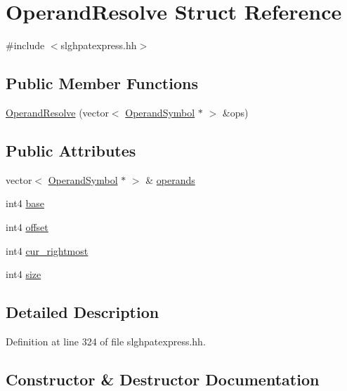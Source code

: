 \hypertarget{struct_operand_resolve}{}\section{Operand\+Resolve Struct Reference}
\label{struct_operand_resolve}


{\ttfamily \#include $<$slghpatexpress.\+hh$>$}

\subsection*{Public Member Functions}
\begin{DoxyCompactItemize}
\item 
\mbox{\hyperlink{struct_operand_resolve_a8a21090ca0ccc61bab067fde9155683b}{Operand\+Resolve}} (vector$<$ \mbox{\hyperlink{class_operand_symbol}{Operand\+Symbol}} $\ast$ $>$ \&ops)
\end{DoxyCompactItemize}
\subsection*{Public Attributes}
\begin{DoxyCompactItemize}
\item 
vector$<$ \mbox{\hyperlink{class_operand_symbol}{Operand\+Symbol}} $\ast$ $>$ \& \mbox{\hyperlink{struct_operand_resolve_a7449add86ddd91d05a9c094ce0db0caa}{operands}}
\item 
int4 \mbox{\hyperlink{struct_operand_resolve_af2b88c1af97c8931bc67720c8227979f}{base}}
\item 
int4 \mbox{\hyperlink{struct_operand_resolve_a57727a1a11c802efc952f3e8f2297606}{offset}}
\item 
int4 \mbox{\hyperlink{struct_operand_resolve_aa639f62ee748da943545d268b5f1e428}{cur\+\_\+rightmost}}
\item 
int4 \mbox{\hyperlink{struct_operand_resolve_a6a5483179571063bbc69a34044a367e7}{size}}
\end{DoxyCompactItemize}


\subsection{Detailed Description}


Definition at line 324 of file slghpatexpress.\+hh.



\subsection{Constructor \& Destructor Documentation}
\mbox{\label{struct_operand_resolve_a8a21090ca0ccc61bab067fde9155683b}} 
